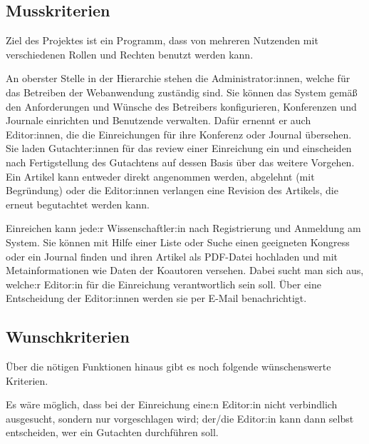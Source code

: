 
\subsection{Musskriterien}
Ziel des Projektes ist ein Programm, dass von mehreren Nutzenden mit verschiedenen Rollen und Rechten benutzt werden kann.

An oberster Stelle in der Hierarchie stehen die Administrator:innen, welche für das Betreiben der Webanwendung zuständig sind.
Sie können das System gemäß den Anforderungen und Wünsche des Betreibers konfigurieren, Konferenzen und Journale einrichten und Benutzende verwalten.
Dafür ernennt er auch Editor:innen, die die Einreichungen für ihre Konferenz oder Journal übersehen.
Sie laden Gutachter:innen für das review einer Einreichung ein und einscheiden nach Fertigstellung des Gutachtens auf dessen Basis über das weitere Vorgehen.
Ein Artikel kann entweder direkt angenommen werden, abgelehnt (mit Begründung) oder die Editor:innen verlangen eine Revision des Artikels, die erneut begutachtet werden kann.

Einreichen kann jede:r Wissenschaftler:in nach Registrierung und Anmeldung am System.
Sie können mit Hilfe einer Liste oder Suche einen geeigneten Kongress oder ein Journal finden und ihren Artikel als PDF-Datei hochladen und mit Metainformationen wie Daten der Koautoren versehen.
Dabei sucht man sich aus, welche:r Editor:in für die Einreichung verantwortlich sein soll.
Über eine Entscheidung der Editor:innen werden sie per E-Mail benachrichtigt.

\subsection{Wunschkriterien}

Über die nötigen Funktionen hinaus gibt es noch folgende wünschenswerte Kriterien.

Es wäre möglich, dass bei der Einreichung eine:n Editor:in nicht verbindlich ausgesucht, sondern nur vorgeschlagen wird;
der/die Editor:in kann dann selbst entscheiden, wer ein Gutachten durchführen soll.